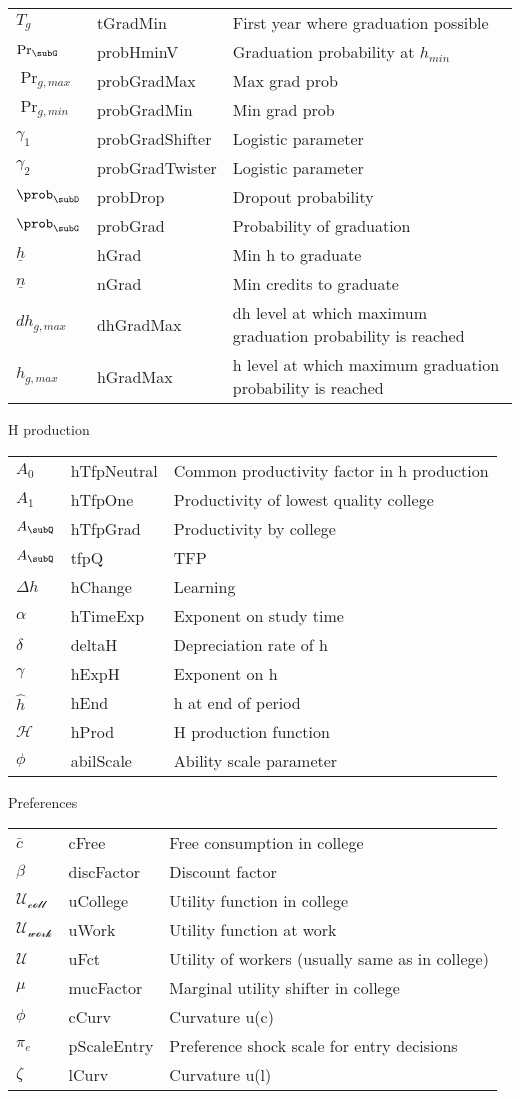 \begin{tabular}{lll}
\hline
$T_{g}$ & tGradMin & First year where graduation possible\tabularnewline
$\Pr_{\subG}$ & probHminV & Graduation probability at $h_{min}$\tabularnewline
$\Pr_{g,max}$ & probGradMax & Max grad prob\tabularnewline
$\Pr_{g,min}$ & probGradMin & Min grad prob\tabularnewline
$\gamma_1$ & probGradShifter & Logistic parameter\tabularnewline
$\gamma_2$ & probGradTwister & Logistic parameter\tabularnewline
$\prob_{\subD}$ & probDrop & Dropout probability\tabularnewline
$\prob_{\subG}$ & probGrad & Probability of graduation\tabularnewline
$\underline{h}$ & hGrad & Min h to graduate\tabularnewline
$\underline{n}$ & nGrad & Min credits to graduate\tabularnewline
$dh_{g,max}$ & dhGradMax & dh level at which maximum graduation probability is reached\tabularnewline
$h_{g,max}$ & hGradMax & h level at which maximum graduation probability is reached\tabularnewline
\hline
\end{tabular}
 
H production

\begin{tabular}{lll}
\hline
$A_{0}$ & hTfpNeutral & Common productivity factor in h production\tabularnewline
$A_{1}$ & hTfpOne & Productivity of lowest quality college\tabularnewline
$A_{\subQ}$ & hTfpGrad & Productivity by college\tabularnewline
$A_{\subQ}$ & tfpQ & TFP\tabularnewline
$\Delta h$ & hChange & Learning\tabularnewline
$\alpha$ & hTimeExp & Exponent on study time\tabularnewline
$\delta$ & deltaH & Depreciation rate of h\tabularnewline
$\gamma$ & hExpH & Exponent on h\tabularnewline
$\hat{h}$ & hEnd & h at end of period\tabularnewline
$\mathcal{H}$ & hProd & H production function\tabularnewline
$\phi$ & abilScale & Ability scale parameter\tabularnewline
\hline
\end{tabular}
 
Preferences

\begin{tabular}{lll}
\hline
$\bar{c}$ & cFree & Free consumption in college\tabularnewline
$\beta$ & discFactor & Discount factor\tabularnewline
$\mathcal{U_{coll}}$ & uCollege & Utility function in college\tabularnewline
$\mathcal{U_{work}}$ & uWork & Utility function at work\tabularnewline
$\mathcal{U}$ & uFct & Utility of workers (usually same as in college)\tabularnewline
$\mu$ & mucFactor & Marginal utility shifter in college\tabularnewline
$\phi$ & cCurv & Curvature u(c)\tabularnewline
$\pi_{e}$ & pScaleEntry & Preference shock scale for entry decisions\tabularnewline
$\zeta$ & lCurv & Curvature u(l)\tabularnewline
\hline
\end{tabular}
 
